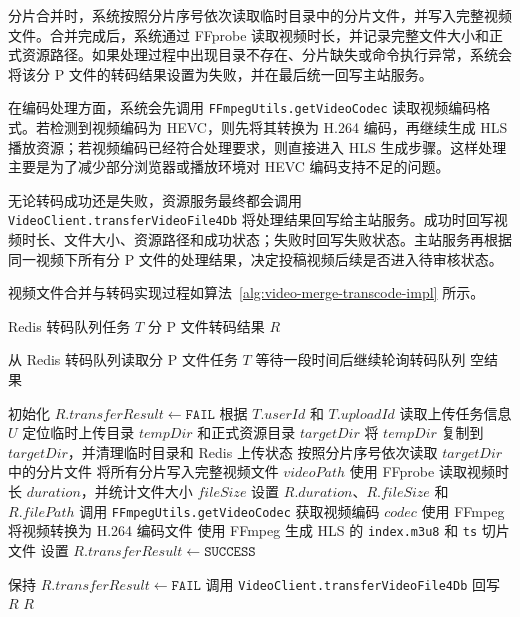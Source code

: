 分片合并时，系统按照分片序号依次读取临时目录中的分片文件，并写入完整视频文件。合并完成后，系统通过 FFprobe 读取视频时长，并记录完整文件大小和正式资源路径。如果处理过程中出现目录不存在、分片缺失或命令执行异常，系统会将该分 P 文件的转码结果设置为失败，并在最后统一回写主站服务。

在编码处理方面，系统会先调用 \texttt{FFmpegUtils.getVideoCodec} 读取视频编码格式。若检测到视频编码为 HEVC，则先将其转换为 H.264 编码，再继续生成 HLS 播放资源；若视频编码已经符合处理要求，则直接进入 HLS 生成步骤。这样处理主要是为了减少部分浏览器或播放环境对 HEVC 编码支持不足的问题。

无论转码成功还是失败，资源服务最终都会调用 \texttt{VideoClient.transferVideoFile4Db} 将处理结果回写给主站服务。成功时回写视频时长、文件大小、资源路径和成功状态；失败时回写失败状态。主站服务再根据同一视频下所有分 P 文件的处理结果，决定投稿视频后续是否进入待审核状态。

视频文件合并与转码实现过程如算法~\ref{alg:video-merge-transcode-impl} 所示。

\begin{algorithm}[!htbp]
    \caption{视频文件合并与转码实现算法}
    \label{alg:video-merge-transcode-impl}
    \begin{algorithmic}[1]
        \Require Redis 转码队列任务 $T$
        \Ensure 分 P 文件转码结果 $R$

        \State 从 Redis 转码队列读取分 P 文件任务 $T$
            \State 等待一段时间后继续轮询转码队列
            \State \Return 空结果
        \EndIf

        \State 初始化 $R.transferResult \leftarrow \texttt{FAIL}$
        \State 根据 $T.userId$ 和 $T.uploadId$ 读取上传任务信息 $U$
        \State 定位临时上传目录 $tempDir$ 和正式资源目录 $targetDir$
        \State 将 $tempDir$ 复制到 $targetDir$，并清理临时目录和 Redis 上传状态
        \State 按照分片序号依次读取 $targetDir$ 中的分片文件
        \State 将所有分片写入完整视频文件 $videoPath$
        \State 使用 FFprobe 读取视频时长 $duration$，并统计文件大小 $fileSize$
        \State 设置 $R.duration$、$R.fileSize$ 和 $R.filePath$
        \State 调用 \texttt{FFmpegUtils.getVideoCodec} 获取视频编码 $codec$
            \State 使用 FFmpeg 将视频转换为 H.264 编码文件
        \EndIf
        \State 使用 FFmpeg 生成 HLS 的 \texttt{index.m3u8} 和 \texttt{ts} 切片文件
        \State 设置 $R.transferResult \leftarrow \texttt{SUCCESS}$

            \State 保持 $R.transferResult \leftarrow \texttt{FAIL}$
        \EndIf
        \State 调用 \texttt{VideoClient.transferVideoFile4Db} 回写 $R$
        \State \Return $R$
    \end{algorithmic}
\end{algorithm}

